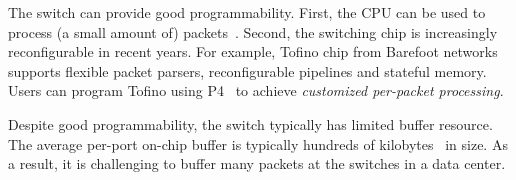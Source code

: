 The switch can provide good programmability. First, the CPU can be used to process (a small amount of) packets~\cite{lu2011serverswitch}.
Second, the switching chip is increasingly reconfigurable in recent years. For example, Tofino chip from Barefoot networks~\cite{tofino} 
supports flexible packet parsers, reconfigurable pipelines and stateful memory. Users can program Tofino using P4~\cite{bosshart2014p4} to achieve \textit{customized per-packet processing}.

Despite good programmability, the switch typically has limited buffer resource.
The average per-port on-chip buffer is typically hundreds of kilobytes~\cite{bai2017congestion} in size.
As a result, it is challenging to buffer many packets at the switches in a data center.







